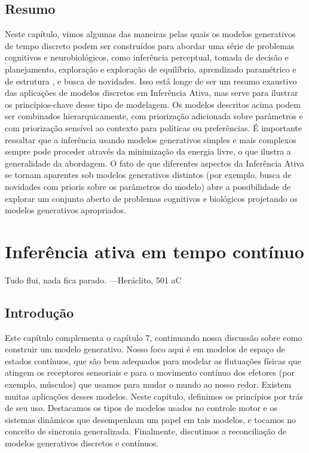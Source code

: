 \documentclass[
  12pt,
]{book}
\begin{document}
\hypertarget{resumo-6}{%
\section{Resumo}\label{resumo-6}}

Neste capítulo, vimos algumas das maneiras pelas quais os modelos generativos de tempo discreto podem ser construídos para abordar uma série de problemas cognitivos e neurobiológicos, como inferência perceptual, tomada de decisão e planejamento, exploração e exploração de equilíbrio, aprendizado paramétrico e de estrutura , e busca de novidades. Isso está longe de ser um resumo exaustivo das aplicações de modelos discretos em Inferência Ativa, mas serve para ilustrar os princípios-chave desse tipo de modelagem. Os modelos descritos acima podem ser combinados hierarquicamente, com priorização adicionada sobre parâmetros e com priorização sensível ao contexto para políticas ou preferências. É importante ressaltar que a inferência usando modelos generativos simples e mais complexos sempre pode proceder através da minimização da energia livre, o que ilustra a generalidade da abordagem. O fato de que diferentes aspectos da Inferência Ativa se tornam aparentes sob modelos generativos distintos (por exemplo, busca de novidades com prioris sobre os parâmetros do modelo) abre a possibilidade de explorar um conjunto aberto de problemas cognitivos e biológicos projetando os modelos generativos apropriados.

\hypertarget{inferuxeancia-ativa-em-tempo-contuxednuo-1}{%
\chapter{Inferência ativa em tempo contínuo}\label{inferuxeancia-ativa-em-tempo-contuxednuo-1}}

Tudo flui, nada fica parado. ---Heráclito, 501 aC

\hypertarget{introduuxe7uxe3o-7}{%
\section{Introdução}\label{introduuxe7uxe3o-7}}

Este capítulo complementa o capítulo 7, continuando nossa discussão sobre como construir um modelo generativo. Nosso foco aqui é em modelos de espaço de estados contínuos, que são bem adequados para modelar as flutuações físicas que atingem os receptores sensoriais e para o movimento contínuo dos efetores (por exemplo, músculos) que usamos para mudar o mundo ao nosso redor. Existem muitas aplicações desses modelos. Neste capítulo, definimos os princípios por trás de seu uso. Destacamos os tipos de modelos usados no controle motor e os sistemas dinâmicos que desempenham um papel em tais modelos, e tocamos no conceito de sincronia generalizada. Finalmente, discutimos a reconciliação de modelos generativos discretos e contínuos.
\end{document}
